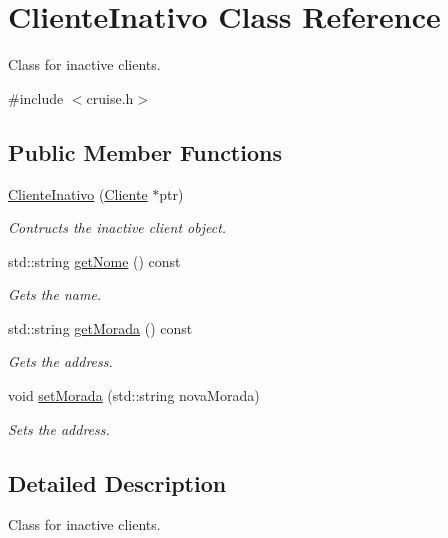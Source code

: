 \hypertarget{classClienteInativo}{}\section{Cliente\+Inativo Class Reference}
\label{classClienteInativo}


Class for inactive clients.  




{\ttfamily \#include $<$cruise.\+h$>$}

\subsection*{Public Member Functions}
\begin{DoxyCompactItemize}
\item 
\hyperlink{classClienteInativo_a89308172bb87ed33261ab3f0543b407d}{Cliente\+Inativo} (\hyperlink{classCliente}{Cliente} $\ast$ptr)
\begin{DoxyCompactList}\small\item\em Contructs the inactive client object. \end{DoxyCompactList}\item 
std\+::string \hyperlink{classClienteInativo_a0d29faf815a74d59a7f3e4028d5aad2a}{get\+Nome} () const 
\begin{DoxyCompactList}\small\item\em Gets the name. \end{DoxyCompactList}\item 
std\+::string \hyperlink{classClienteInativo_ad7bb77ba3d2752dc916fdc7072846969}{get\+Morada} () const 
\begin{DoxyCompactList}\small\item\em Gets the address. \end{DoxyCompactList}\item 
void \hyperlink{classClienteInativo_aea3df2299f33ea2f4e22f406ba73d5b2}{set\+Morada} (std\+::string nova\+Morada)
\begin{DoxyCompactList}\small\item\em Sets the address. \end{DoxyCompactList}\end{DoxyCompactItemize}


\subsection{Detailed Description}
Class for inactive clients. 

